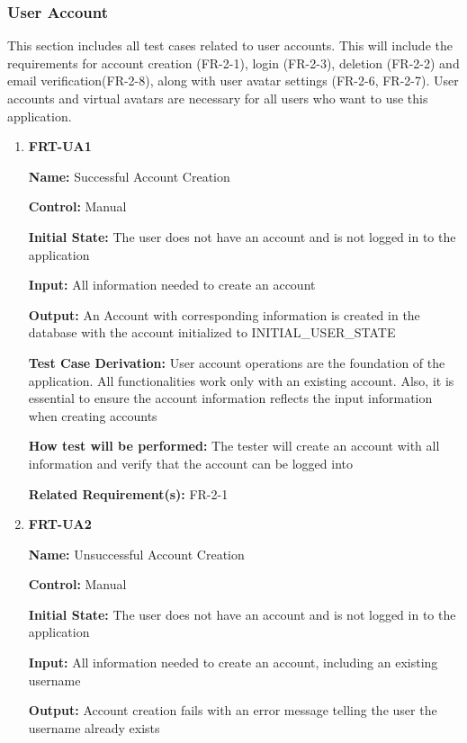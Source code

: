 \documentclass[12pt, titlepage]{article}
\begin{document}
\subsubsection{User Account}

This section includes all test cases related to user accounts. This will include the requirements for account creation (FR-2-1), login (FR-2-3), deletion (FR-2-2) and email verification(FR-2-8), along with user avatar settings (FR-2-6, FR-2-7). User accounts and virtual avatars are necessary for all users who want to use this application.

\begin{enumerate}

\item{\textbf{FRT-UA1}}

\textbf{Name:} Successful Account Creation

\textbf{Control:} Manual
					
\textbf{Initial State:} The user does not have an account and is not logged in to the application

\textbf{Input:} All information needed to create an account
					
\textbf{Output:} An Account with corresponding information is created in the database with the account initialized to INITIAL\_USER\_STATE

\textbf{Test Case Derivation:}  User account operations are the foundation of the application. All functionalities work only with an existing account. Also, it is essential to ensure the account information reflects the input information when creating accounts
					
\textbf{How test will be performed:} The tester will create an account with all information and verify that the account can be logged into

\textbf{Related Requirement(s):} FR-2-1

\item{\textbf{FRT-UA2}}

\textbf{Name:} Unsuccessful Account Creation

\textbf{Control:} Manual
					
\textbf{Initial State:} The user does not have an account and is not logged in to the application

\textbf{Input:} All information needed to create an account, including an existing username
					
\textbf{Output:} Account creation fails with an error message telling the user the username already exists


\end{enumerate}
\end{document}
